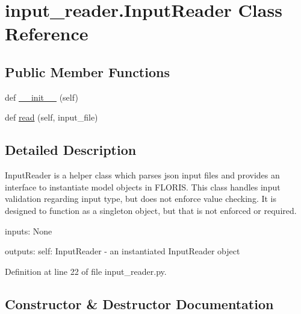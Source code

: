 \hypertarget{classinput__reader_1_1_input_reader}{}\section{input\+\_\+reader.\+Input\+Reader Class Reference}
\label{classinput__reader_1_1_input_reader}
\subsection*{Public Member Functions}
\begin{DoxyCompactItemize}
\item 
def \mbox{\hyperlink{classinput__reader_1_1_input_reader_aded1175fa2dc916b0b9b47794a4717dc}{\+\_\+\+\_\+init\+\_\+\+\_\+}} (self)
\item 
def \mbox{\hyperlink{classinput__reader_1_1_input_reader_a01b4a6e2f28f3f0356a6e4aeb5bb2781}{read}} (self, input\+\_\+file)
\end{DoxyCompactItemize}


\subsection{Detailed Description}
\begin{DoxyVerb}InputReader is a helper class which parses json input files and provides an
interface to instantiate model objects in FLORIS. This class handles input
validation regarding input type, but does not enforce value checking. It is
designed to function as a singleton object, but that is not enforced or required.

inputs:
    None

outputs:
    self: InputReader - an instantiated InputReader object
\end{DoxyVerb}
 

Definition at line 22 of file input\+\_\+reader.\+py.



\subsection{Constructor \& Destructor Documentation}
\mbox{\label{classinput__reader_1_1_input_reader_aded1175fa2dc916b0b9b47794a4717dc}} 

